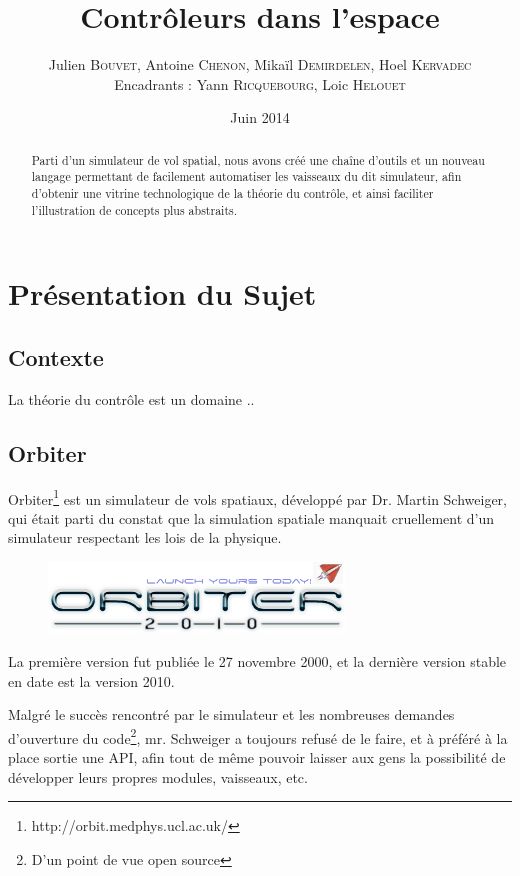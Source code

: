 \documentclass[a4paper,11pt]{article}
\title{\textbf{Contrôleurs dans l'espace}}
\author{Julien \textsc{Bouvet}, Antoine \textsc{Chenon}, Mikaïl \textsc{Demirdelen}, Hoel \textsc{Kervadec}
        \\
        Encadrants : Yann \textsc{Ricquebourg}, Loic \textsc{Helouet}}
\date{Juin 2014}
\begin{document}
\thispagestyle{empty}

\maketitle
\begin{abstract}
    Parti d'un simulateur de vol spatial, nous avons créé une chaîne d'outils et un nouveau langage permettant de facilement automatiser les vaisseaux du dit simulateur, afin d'obtenir une vitrine technologique de la théorie du contrôle, et ainsi faciliter l'illustration de concepts plus abstraits.
\end{abstract}

\section{Présentation du Sujet}
    \subsection{Contexte}
        La théorie du contrôle est un domaine ..

    \subsection{Orbiter}
        Orbiter\footnote{http://orbit.medphys.ucl.ac.uk/} est un simulateur de vols spatiaux, développé par Dr. Martin Schweiger, qui était parti du constat que la simulation spatiale manquait cruellement d'un simulateur respectant les lois de la physique.

        \begin{figure}[!h]
            \begin{center}
                \includegraphics[width=0.7\textwidth]{img/orbiter_logo.png}
            \end{center}
        \end{figure}

        La première version fut publiée le 27 novembre 2000, et la dernière version stable en date est la version 2010.

        Malgré le succès rencontré par le simulateur et les nombreuses demandes d'ouverture du code\footnote{D'un point de vue open source}, mr. Schweiger a toujours refusé de le faire, et à préféré à la place sortie une API, afin tout de même pouvoir laisser aux gens la possibilité de développer leurs propres modules, vaisseaux, etc.
\end{document}
